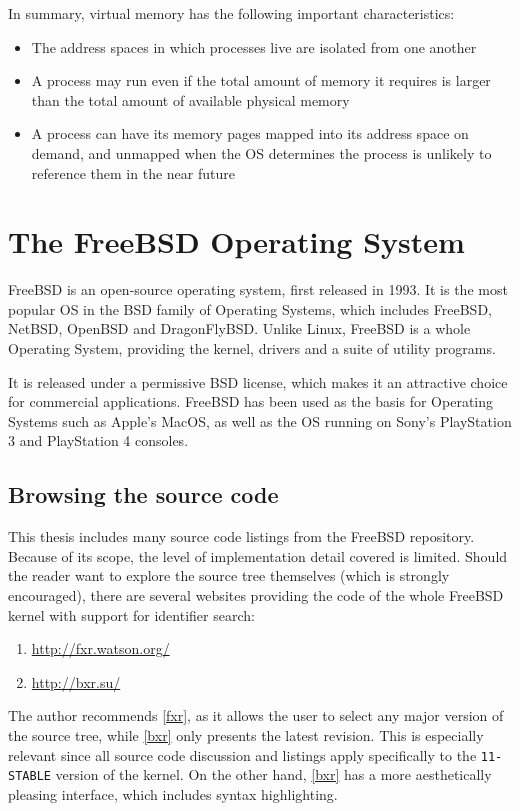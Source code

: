 \documentclass[shortabstract, english]{iithesis}
\begin{document}
In summary, virtual memory has the following important characteristics:
\begin{itemize}
\item The address spaces in which processes live are isolated from one another
\item A process may run even if the total amount of memory it requires is larger
  than the total amount of available physical memory
\item A process can have its memory pages mapped into its address space on
  demand, and unmapped when the OS determines the process is unlikely to
  reference them in the near future
\end{itemize}

\section{The FreeBSD Operating System}

FreeBSD is an open-source operating system, first released in 1993. It is the
most popular OS in the BSD family of Operating Systems, which includes FreeBSD,
NetBSD, OpenBSD and DragonFlyBSD. Unlike Linux, FreeBSD is a whole Operating
System, providing the kernel, drivers and a suite of utility programs.

It is released under a permissive BSD license, which makes it an attractive
choice for commercial applications. FreeBSD has been used as the basis for
Operating Systems such as Apple's MacOS, as well as the OS running on Sony's
PlayStation 3 and PlayStation 4 consoles.

\subsection{Browsing the source code}

This thesis includes many source code listings from the FreeBSD repository.
Because of its scope, the level of implementation detail covered is limited.
Should the reader want to explore the source tree themselves (which is strongly
encouraged), there are several websites providing the code of the whole FreeBSD
kernel with support for identifier search:
\begin{enumerate}[label=\textnormal{(\arabic*)}]
\item \url{http://fxr.watson.org/}\label{fxr}
\item \url{http://bxr.su/}\label{bxr}
\end{enumerate}

The author recommends \ref{fxr}, as it allows the user to select any major
version of the source tree, while \ref{bxr} only presents the latest revision.
This is especially relevant since all source code discussion and listings apply
specifically to the \texttt{11-STABLE} version of the kernel. On the other hand,
\ref{bxr} has a more aesthetically pleasing interface, which includes syntax
highlighting.
\end{document}
